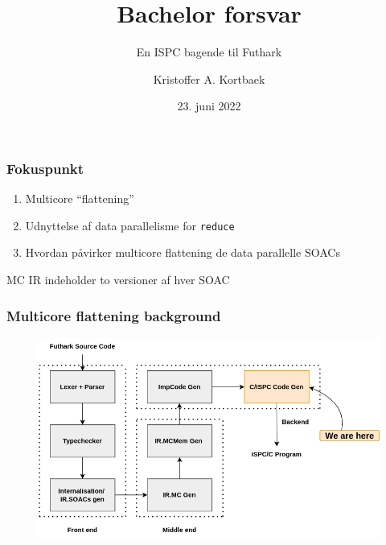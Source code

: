 \documentclass[t]{beamer}
\title{Bachelor forsvar}
\subtitle{En ISPC bagende til Futhark}
\author{Kristoffer A. Kortbaek}
\date{23. juni 2022}
\begin{document}
\begin{frame}
  \titlepage
\end{frame}

\begin{frame}[c]
  \frametitle{Fokuspunkt}

  \begin{enumerate}
    \item<+-> Multicore ``flattening''
    \item<+-> Udnyttelse af data parallelisme for \texttt{reduce}
    \item<+-> Hvordan påvirker multicore flattening de data parallelle SOACs
  \end{enumerate}
\end{frame}

\begin{frame}
MC IR indeholder to versioner af hver SOAC
  \frametitle{Multicore flattening background}
  \begin{figure}[H]
    \centering
    \includegraphics[height=0.7\textheight]{imgs/compileroverview.png}
  \end{figure}
\end{frame}
\end{document}
